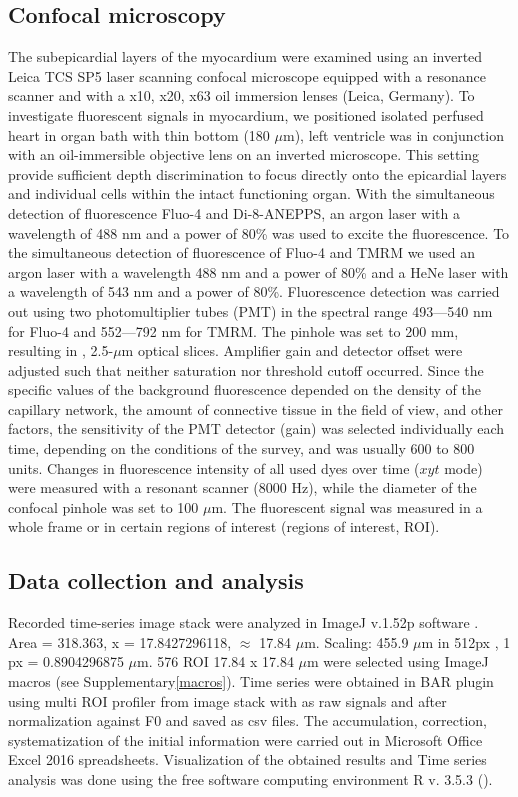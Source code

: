 \documentclass{biophys-new}
\begin{document}
\subsection*{Confocal microscopy}

The subepicardial layers of the myocardium were examined using an inverted Leica TCS SP5 laser scanning confocal microscope equipped with a resonance scanner and with a x10, x20, x63 oil immersion lenses (Leica, Germany).
To investigate fluorescent signals in myocardium, we positioned isolated perfused heart in organ bath with thin bottom (180 $\mu$m), left ventricle was in conjunction with an oil-immersible objective lens on an inverted microscope.
This setting provide sufficient depth discrimination to focus directly onto the epicardial layers and individual cells within the intact functioning organ.
With the simultaneous detection of fluorescence Fluo-4 and Di-8-ANEPPS, an argon laser with a wavelength of 488 nm and a power of 80\% was used to excite the fluorescence.
To the simultaneous detection of fluorescence of Fluo-4 and TMRM we used an argon laser with a wavelength 488 nm and a power of 80\% and a HeNe laser with a wavelength of 543 nm and a power of 80\%.
Fluorescence detection was carried out using two photomultiplier tubes (PMT) in the spectral range 493---540 nm for Fluo-4 and 552---792 nm for TMRM.
The pinhole was set to 200 mm, resulting in , 2.5-$\mu$m optical slices. Amplifier gain and detector offset were adjusted such that neither saturation nor threshold cutoff occurred.
Since the specific values of the background fluorescence depended on the density of the capillary network, the amount of connective tissue in the field of view, and other factors, the sensitivity of the PMT detector (gain) was selected individually each time, depending on the conditions of the survey, and was usually 600 to 800 units.
Changes in fluorescence intensity of all used dyes over time ($xyt$ mode) were measured with a resonant scanner (8000 Hz), while the diameter of the confocal pinhole was set to 100 $\mu$m.
The fluorescent signal was measured in a whole frame or in certain regions of interest (regions of interest, ROI).


\subsection*{Data collection and analysis}

Recorded time-series image stack were analyzed in ImageJ v.1.52p software \cite{rueden2017imagej2}.
Area = 318.363, x = 17.8427296118, $\approx$ 17.84 $\mu$m.
Scaling: 455.9 $\mu$m in 512px , 1 px = 0.8904296875 $\mu$m.
576 ROI 17.84 x 17.84 $\mu$m were selected using ImageJ macros (see Supplementary\ref{macros}).
Time series were obtained in BAR plugin using multi ROI profiler from image stack with as raw signals and after normalization against F0 and saved as csv files.
The accumulation, correction, systematization of the initial information were carried out in Microsoft Office Excel 2016 spreadsheets.
Visualization of the obtained results and Time series analysis was done using the free software computing environment R v. 3.5.3 (\cite{team2014r}).
\end{document}
